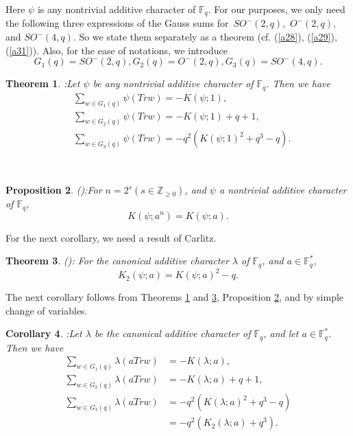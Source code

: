 \documentclass[a4,12pt]{elsart}
\newtheorem{theorem}{Theorem}
\newtheorem{corollary}[theorem]{Corollary}
\newtheorem{proposition}[theorem]{Proposition}
\begin{document}
Here $\psi$ is any nontrivial additive character of ${\mathbb{F}}_q$. For our
purposes, we only need the following three expressions of the Gauss
sums for~$SO^-(2,q),$ $O^-(2,q)$, and $SO^-(4,q)$.  So we state them
separately as a theorem (cf. (\ref{a28}), (\ref{a29}), (\ref{a31})).
Also, for the ease of notations, we introduce
\begin{equation*}
G_1(q) = SO^-(2,q), G_2(q) = O^-(2,q), G_3(q) = SO^-(4,q).
\end{equation*}

\begin{theorem}:\label{E}
 Let $\psi$ be any nontrivial additive character of ${\mathbb{F}}_q$. Then we have
 \begin{align*}
& \sum_{w \in G_1(q)} \psi(Tr w) =- K(\psi ; 1),\\
& \sum_{w \in G_2(q)} \psi(Tr w) =-  K(\psi ; 1) + q + 1,\\
& \sum_{w \in G_3(q)} \psi(Tr w) =- q^2(K(\psi ; 1)^2 +q^3-q).
\end{align*}
\end{theorem}\

\begin{proposition}(\cite{D3}):\label{F}
For $n=2^s(s \in \mathbb{Z}_{\geq 0})$, and $\psi$  a nontrivial
additive character of ${\mathbb{F}}_q$,
\[
K(\psi;a^n) = K(\psi;a).
\]
\end{proposition}
For the next corollary, we need a result of Carlitz.

\begin{theorem}\label{G}(\cite{L2}):
For the canonical additive character $\lambda$ of ${\mathbb{F}}_q$, and $a
\in {\mathbb{F}}_{q} ^{*}$,
\begin{equation}\label{a32}
K_{2}(\psi;a) = K(\psi;a)^{2}-q.
\end{equation}
\end{theorem}

The next corollary follows from Theorems \ref{E} and \ref{G},
Proposition \ref{F}, and
by simple change of variables.\\

\begin{corollary}:\label{H}
 Let  $\lambda$ be the canonical additive character of \; ${\mathbb{F}}_q$, and let $a \in {\mathbb{F}}_q^*$. Then we have
 \begin{align}
\sum_{w \in G_1(q)} \lambda(aTrw) &= -K(\lambda;a),\\
\sum_{w \in G_2(q)} \lambda(aTrw) &= -K(\lambda;a)+q+1,\\
\sum_{w \in G_3(q)} \lambda(aTrw) &= -q^2(K(\lambda;a)^2+q^3-q)\\
                                  &= -q^2(K_2(\lambda;a)+q^3).
 \end{align}
\end{corollary}\
\end{document}
